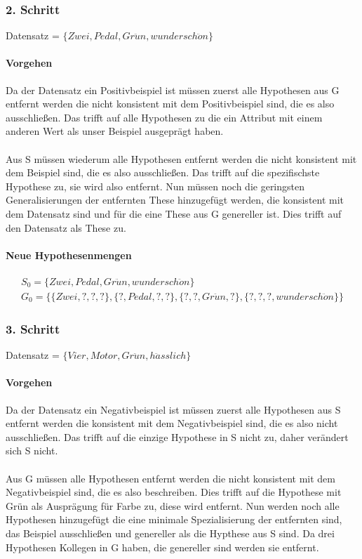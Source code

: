 \documentclass[a4paper]{article}
\begin{document}
\subsubsection{2. Schritt}
Datensatz = $ \{Zwei, Pedal, Gr\ddot{u}n, wundersch\ddot{o}n\} $
\paragraph{Vorgehen}
Da der Datensatz ein Positivbeispiel ist müssen zuerst alle Hypothesen aus G entfernt werden die nicht konsistent mit dem Positivbeispiel sind, die es also ausschließen. Das trifft auf alle Hypothesen zu die ein Attribut mit einem anderen Wert als unser Beispiel ausgeprägt haben.
\paragraph{}
Aus S müssen wiederum alle Hypothesen entfernt werden die nicht konsistent mit dem Beispiel sind, die es also ausschließen. Das trifft auf die spezifischste Hypothese zu, sie wird also entfernt. Nun müssen noch die geringsten Generalisierungen der entfernten These hinzugefügt werden, die konsistent mit dem Datensatz sind und für die eine These aus G genereller ist. Dies trifft auf den Datensatz als These zu.
\paragraph{Neue Hypothesenmengen}
\begin{align*}
	S_0 = \{Zwei,Pedal,Gr\ddot{u}n,wundersch\ddot{o}n\} \\
	G_0 = \{ \{Zwei,?,?,?\},\{?,Pedal,?,?\}, \{?,?,Gr\ddot{u}n,?\}, \{?,?,?,wundersch\ddot{o}n\} \}
\end{align*}

\subsubsection{3. Schritt}
Datensatz = $ \{Vier, Motor, Gr\ddot{u}n, h\ddot{a}sslich\} $
\paragraph{Vorgehen}
Da der Datensatz ein Negativbeispiel ist müssen zuerst alle Hypothesen aus S entfernt werden die konsistent mit dem Negativbeispiel sind, die es also nicht ausschließen. Das trifft auf die einzige Hypothese in S nicht zu, daher verändert sich S nicht.
\paragraph{}
Aus G müssen alle Hypothesen entfernt werden die nicht konsistent mit dem Negativbeispiel sind, die es also beschreiben. Dies trifft auf die Hypothese mit Grün als Ausprägung für Farbe zu, diese wird entfernt. Nun werden noch alle Hypothesen hinzugefügt die eine minimale Spezialisierung der entfernten sind, das Beispiel ausschließen und genereller als die Hypthese aus S sind. Da drei Hypothesen Kollegen in G haben, die genereller sind werden sie entfernt.
\end{document}
